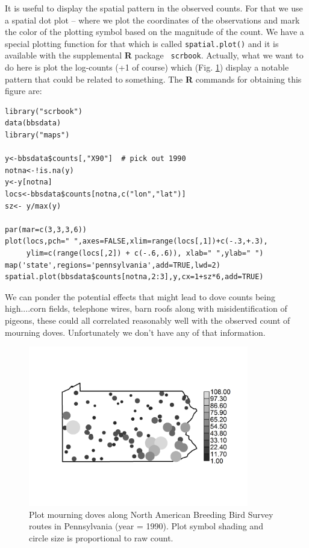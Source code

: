 It is useful to display the spatial pattern in the observed
counts. For that we use a spatial dot plot -- where we plot the
coordinates of the observations and mark the color of the plotting
symbol based on the magnitude of the count.  We have a special
plotting function for that which is called \mbox{\tt spatial.plot()}
and it is available with the supplemental {\bf R} package \mbox{\tt
  scrbook}.  Actually, what we want to do here is plot the log-counts
(+1 of course) which (Fig. \ref{glms.fig.padovecounts}) display a
notable pattern that could be related to something. The {\bf R}
commands for obtaining this figure are: 
{\small
\begin{verbatim}
library("scrbook")
data(bbsdata)
library("maps")

y<-bbsdata$counts[,"X90"]  # pick out 1990
notna<-!is.na(y)
y<-y[notna]
locs<-bbsdata$counts[notna,c("lon","lat")]
sz<- y/max(y)

par(mar=c(3,3,3,6))
plot(locs,pch=" ",axes=FALSE,xlim=range(locs[,1])+c(-.3,+.3),
     ylim=c(range(locs[,2]) + c(-.6,.6)), xlab=" ",ylab=" ")
map('state',regions='pennsylvania',add=TRUE,lwd=2)
spatial.plot(bbsdata$counts[notna,2:3],y,cx=1+sz*6,add=TRUE)
\end{verbatim}
}
We can ponder the potential effects that
might lead to dove counts being high....corn fields, telephone wires,
barn roofs along with misidentification of pigeons, these could all
correlated reasonably well with the observed count of mourning doves.
Unfortunately we don't have any of that information.
\begin{figure}
\begin{center}
\includegraphics[height=2.75in]{Ch2-Bayes/figs/pacounts}
\end{center}
\caption{Plot  mourning doves along North American Breeding Bird
  Survey routes in Pennsylvania (year = 1990). Plot symbol shading and
  circle size is
  proportional to raw count. }
\label{glms.fig.padovecounts}
\end{figure}
